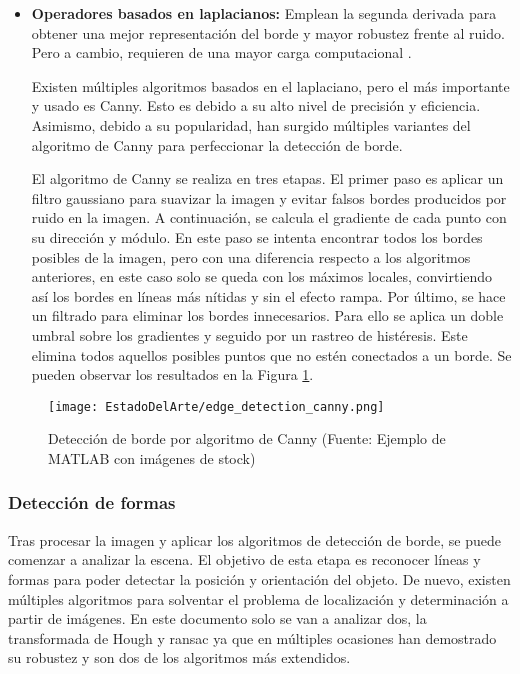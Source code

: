 \begin{itemize}
\item \textbf{Operadores basados en laplacianos:} Emplean la segunda derivada para obtener una mejor representación del borde y mayor robustez frente al ruido. Pero a cambio, requieren de una mayor carga computacional \cite{edgecomp}.

Existen múltiples algoritmos basados en el laplaciano, pero el más importante y usado es Canny. Esto es debido a su alto nivel de precisión y eficiencia. Asimismo, debido a su popularidad, han surgido múltiples variantes del algoritmo de Canny para perfeccionar la detección de borde.

El algoritmo de Canny se realiza en tres etapas. El primer paso es aplicar un filtro gaussiano para suavizar la imagen y evitar falsos bordes producidos por ruido en la imagen. A continuación, se calcula el gradiente de cada punto con su dirección y módulo. En este paso se intenta encontrar todos los bordes posibles de la imagen, pero con una diferencia respecto a los algoritmos anteriores, en este caso solo se queda con los máximos locales, convirtiendo así los bordes en líneas más nítidas y sin el efecto rampa. Por último, se hace un filtrado para eliminar los bordes innecesarios. Para ello se aplica un doble umbral sobre los gradientes y seguido por un rastreo de histéresis. Este elimina todos aquellos posibles puntos que no estén conectados a un borde. Se pueden observar los resultados en la Figura \ref{chap:Estado de la cuestion fig:EDGE2}.
\end{itemize}

\begin{figure}[ht]
	\centering
	\texttt{[image: EstadoDelArte/edge\_detection\_canny.png]}
	\caption[Detección de borde por algoritmo de Canny]{Detección de borde por algoritmo de Canny (Fuente: Ejemplo de MATLAB con imágenes de stock)}
	\label{chap:Estado de la cuestion fig:EDGE2}
	\vspace{-5pt}
\end{figure}
	
\subsubsection*{Detección de formas}
Tras procesar la imagen y aplicar los algoritmos de detección de borde, se puede comenzar a analizar la escena. El objetivo de esta etapa es reconocer líneas y formas para poder detectar la posición y orientación del objeto. De nuevo, existen múltiples algoritmos para solventar el problema de localización y determinación a partir de imágenes. En este documento solo se van a analizar dos, la transformada de Hough y \acs{ransac} ya que en múltiples ocasiones han demostrado su robustez y son dos de los algoritmos más extendidos.

